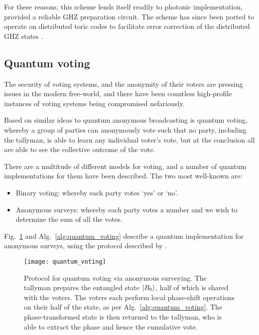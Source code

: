 For these reasons, this scheme lends itself readily to photonic implementation, provided a reliable GHZ preparation circuit. The scheme has since been ported to operate on distributed toric codes to facilitate error correction of the distributed GHZ states \cite{bib:MenicucciExpQAB}.

%
%

\subsection{Quantum voting}

The security of voting systems, and the anonymity of their voters are pressing issues in the modern free-world, and there have been countless high-profile instances of voting systems being compromised nefariously.

Based on similar ideas to quantum anonymous broadcasting is quantum voting, whereby a group of parties can anonymously vote such that no party, including the tallyman, is able to learn any individual voter's vote, but at the conclusion all are able to see the collective outcome of the vote.

There are a multitude of different models for voting, and a number of quantum implementations for them have been described. The two most well-known are:
\begin{itemize}
	\item Binary voting: whereby each party votes `yes' or `no'. 
	\item Anonymous surveys: whereby each party votes a number and we wish to determine the sum of all the votes.
\end{itemize}

Fig.~\ref{fig:quantum_voting} and Alg.~\ref{alg:quantum_voting} describe a quantum implementation for anonymous surveys, using the protocol described by \cite{bib:VaccaroVoting}.

\begin{figure}[!htbp]
\texttt{[image: quantum\_voting]}
\captionspacefig \caption{Protocol for quantum voting via anonymous surveying. The tallyman prepares the entangled state $|B_0\rangle$, half of which is shared with the voters. The voters each perform local phase-shift operations on their half of the state, as per Alg.~\ref{alg:quantum_voting}. The phase-transformed state is then returned to the tallyman, who is able to extract the phase and hence the cumulative vote.}\label{fig:quantum_voting}	
\end{figure}

